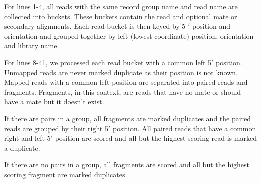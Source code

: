 \documentclass{acm_proc_article-sp}
\begin{document}
For lines 1-4, all reads with the same record group name and read name are collected 
into buckets. These buckets contain the read and optional mate or secondary alignments.
Each read bucket is then keyed by 5 $'$ position and orientation and grouped together by
left (lowest coordinate) position, orientation and library name.

For lines 8-41, we processed each read bucket with a common left 5$'$ position. Unmapped
reads are never marked duplicate as their position is not known. Mapped reads with a common
left position are separated into paired reads and fragments. Fragments, in this context,
are reads that have no mate or should have a mate but it doesn't exist.

If there are pairs in a group, all fragments are marked duplicates and the paired reads are grouped
by their right 5$'$ position. All paired reads that have a common right and left 5$'$
position are scored and all but the highest scoring read is marked a duplicate.

If there are no pairs in a group, all fragments are scored and all but the highest scoring fragment
are marked duplicates.

\end{document}
